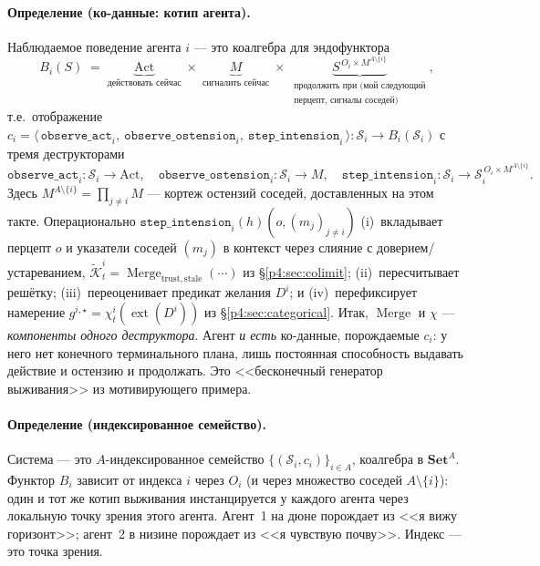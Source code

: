 \documentclass{article}
\newcommand{\method}[1]{\texttt{#1}}
\begin{document}
\paragraph{Определение (ко-данные: котип агента).}
Наблюдаемое поведение агента $i$ --- это коалгебра для эндофунктора
\[
  B_i(S)\;=\;\underbrace{\mathrm{Act}}_{\text{действовать сейчас}}\;\times\;
            \underbrace{M}_{\text{сигналить сейчас}}\;\times\;
            \underbrace{S^{\,O_i\times M^{A\setminus\{i\}}}}_{\substack{\text{продолжить при (мой следующий}\\ \text{перцепт, сигналы соседей)}}},
\]
т.е.\ отображение $c_i=\big\langle\, \method{observe\_act}_i,\ \method{observe\_ostension}_i,\ \method{step\_intension}_i \,\big\rangle : \mathcal{S}_i \to B_i(\mathcal{S}_i)$ с тремя деструкторами
\[
  \method{observe\_act}_i:\mathcal{S}_i\to\mathrm{Act},\quad
  \method{observe\_ostension}_i:\mathcal{S}_i\to M,\quad
  \method{step\_intension}_i:\mathcal{S}_i\to \mathcal{S}_i^{\,O_i\times M^{A\setminus\{i\}}} .
\]
Здесь $M^{A\setminus\{i\}}=\prod_{j\neq i}M$ --- кортеж остензий соседей,
доставленных на этом такте. Операционально
$\method{step\_intension}_i(h)(o,(m_j)_{j\neq i})$
(i)~вкладывает перцепт $o$ и указатели соседей $(m_j)$ в контекст через
слияние с доверием/устареванием,
$\widetilde{\mathcal K}_t^i=\operatorname{Merge}_{\mathrm{trust,stale}}(\cdots)$
из \S\ref{p4:sec:colimit}; (ii)~пересчитывает решётку; (iii)~переоценивает
предикат желания $D^i$; и (iv)~перефиксирует намерение
$g^{i,\star}=\chi_t^i(\operatorname{ext}(D^i))$ из \S\ref{p4:sec:categorical}.
Итак, $\operatorname{Merge}$ и $\chi$ --- \emph{компоненты одного
деструктора}. Агент \emph{и есть} ко-данные, порождаемые $c_i$: у него
нет конечного терминального плана, лишь постоянная способность выдавать
действие и остензию и продолжать. Это <<бесконечный генератор
выживания>> из мотивирующего примера.

\paragraph{Определение (индексированное семейство).}
Система --- это $A$-индексированное семейство
$\{(\mathcal{S}_i,c_i)\}_{i\in A}$, коалгебра в $\mathbf{Set}^{A}$.
Функтор $B_i$ зависит от индекса $i$ через $O_i$ (и через множество
соседей $A\setminus\{i\}$): один и тот же котип выживания
инстанцируется у каждого агента через локальную точку зрения этого
агента. Агент~1 на дюне порождает из <<я вижу горизонт>>; агент~2 в
низине порождает из <<я чувствую почву>>. Индекс --- это точка зрения.
\end{document}
